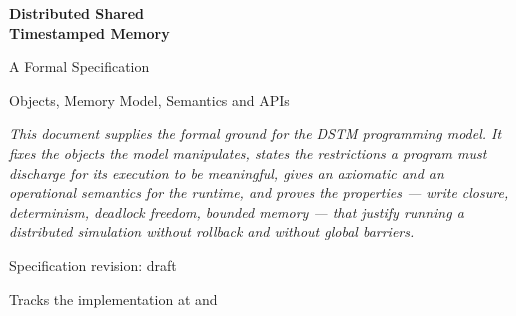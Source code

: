 \documentclass[11pt,a4paper,oneside]{report}
\begin{document}

\begin{titlepage}
\centering
\vspace*{3cm}

{\Huge\bfseries\color{dstmblue} Distributed Shared\\[0.3em] Timestamped Memory\par}
\vspace{1.2cm}
{\LARGE A Formal Specification\par}
\vspace{0.6cm}
{\large Objects, Memory Model, Semantics and APIs\par}

\vspace{2.5cm}

\begin{minipage}{0.78\textwidth}
\small\itshape
This document supplies the formal ground for the DSTM programming model. It
fixes the objects the model manipulates, states the restrictions a program must
discharge for its execution to be meaningful, gives an axiomatic and an
operational semantics for the runtime, and proves the properties --- write
closure, determinism, deadlock freedom, bounded memory --- that justify
running a distributed simulation without rollback and without global
barriers.
\end{minipage}

\vfill

{\large Specification revision: draft\par}
\vspace{0.3em}
{\small Tracks the  implementation at  and \par}

\vspace{1cm}
\end{titlepage}

\setcounter{page}{2}

\tableofcontents
\cleardoublepage
\end{document}
